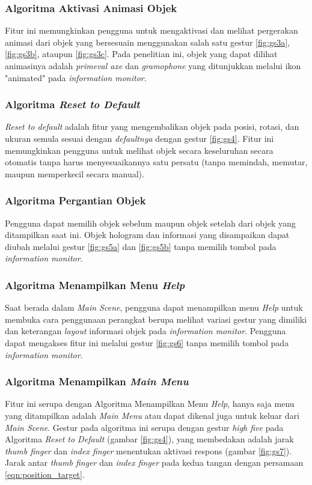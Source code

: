 \documentclass[conference]{IEEEtran}
\begin{document}
		\subsubsection{Algoritma Aktivasi Animasi Objek}
			Fitur ini memungkinkan pengguna untuk mengaktivasi dan melihat pergerakan animasi dari objek yang bersesuain menggunakan salah satu gestur \ref{fig:gs3a}, \ref{fig:gs3b}, ataupun \ref{fig:gs3c}. Pada penelitian ini, objek yang dapat dilihat animasinya adalah \textit{primeval axe} dan \textit{gramophone} yang ditunjukkan melalui ikon "animated" pada \textit{information monitor}.
		
		\subsubsection{Algoritma \textit{Reset to Default}}
			\textit{Reset to default} adalah fitur yang mengembalikan objek pada posisi, rotasi, dan ukuran semula sesuai dengan \textit{defaultnya} dengan gestur \ref{fig:gs4}. Fitur ini memungkinkan pengguna untuk melihat objek secara keseluruhan secara otomatis tanpa harus menyesuaikannya satu persatu (tanpa memindah, memutar, maupun memperkecil secara manual).
		
		\subsubsection{Algoritma Pergantian Objek}
			Pengguna dapat memilih objek sebelum maupun objek setelah dari objek yang ditampilkan saat ini. Objek hologram dan informasi yang disampaikan dapat diubah melalui gestur \ref{fig:gs5a} dan \ref{fig:gs5b} tanpa memilih tombol pada  \textit{information monitor}.
			
		\subsubsection{Algoritma Menampilkan Menu \textit{Help}}
			Saat berada dalam \textit{Main Scene}, pengguna dapat menampilkan menu \textit{Help} untuk membuka cara penggunaan perangkat berupa melihat variasi gestur yang dimiliki dan keterangan \textit{layout} informasi objek pada \textit{information monitor}. Pengguna dapat mengakses fitur ini melalui gestur \ref{fig:gs6} tanpa memilih tombol pada  \textit{information monitor}.
			
		\subsubsection{Algoritma Menampilkan \textit{Main Menu}}
			Fitur ini serupa dengan Algoritma Menampilkan Menu \textit{Help}, hanya saja menu yang ditampilkan adalah \textit{Main Menu} atau dapat dikenal juga untuk keluar dari \textit{Main Scene}. Gestur pada algoritma ini serupa dengan gestur \textit{high five} pada Algoritma \textit{Reset to Default} (gambar \ref{fig:gs4}), yang membedakan adalah jarak \textit{thumb finger} dan \textit{index finger} menentukan aktivasi respons (gambar \ref{fig:gs7}). Jarak antar \textit{thumb finger} dan \textit{index finger} pada kedua tangan dengan persamaan \ref{eqn:position_target}.
			
\end{document}
